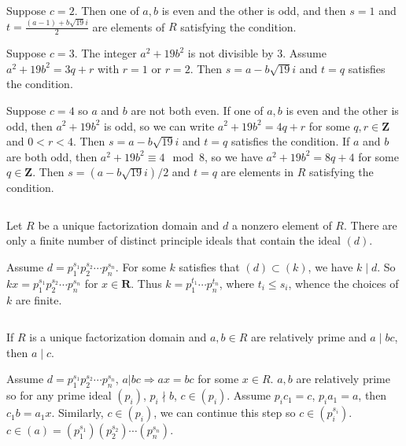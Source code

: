 \begin{answer}
    Suppose $c=2$. Then one of $a,b$ is even and the other is odd, and then $s=1$ and $t=\frac{(a-1)+b\sqrt{19}i}{2}$ are elements of $R$ satisfying the condition.
    
    Suppose $c=3$. The integer $a^{2}+19b^{2}$ is not divisible by 3. Assume $a^{2}+19b^{2}=3q+r$ with $r=1$ or $r=2$. Then $s=a-b\sqrt{19}i$ and $t=q$ satisfies the condition.

    Suppose $c=4$ so $a$ and $b$ are not both even. If one of $a,b$ is even and the other is odd, then $a^{2}+19b^{2}$ is odd, so we can write $a^{2}+19b^{2}=4q+r$ for some $q,r\in \mathbf{Z}$ and $0<r<4$. Then $s=a-b\sqrt{19}i$ and $t=q$ satisfies the condition. If $a$ and $b$ are both odd, then $a^{2}+19b^{2}\equiv 4\mod 8$, so we have $a^{2}+19b^{2}=8q+4$ for some $q\in\mathbf{Z}$. Then $s=(a-b\sqrt{19}i) /2$ and $t=q$ are elements in $R$ satisfying the condition.
\end{answer}

$$ $$

\begin{ex}
    Let $R$ be a unique factorization domain and $d$ a nonzero element of $R$. There are only a finite number of distinct principle ideals that contain the ideal $(d)$.
\end{ex}

\begin{answer}
    Assume $d=p_{1}^{s_{1}}p_{2}^{s_{2}}\cdots p_{n}^{s_{n}}$. For some $k$ satisfies that $(d)\subset (k)$, we have $k\mid d$. So $kx=p_{1}^{s_{1}}p_{2}^{s_{2}}\cdots p_{n}^{s_{n}}$ for $x\in\mathbf{R}$. Thus $k=p_{1}^{t_{1}}\cdots p_{n}^{t_{n}}$, where $t_{i}\leq s_{i}$, whence the choices of $k$ are finite.
\end{answer}

$$ $$

\begin{ex}
    If $R$ is a unique factorization domain and $a,b\in R$ are relatively prime and $a\mid bc$, then $a\mid c$.
\end{ex}

\begin{answer}
    Assume $d=p_{1}^{s_{1}}p_{2}^{s_{2}}\cdots p_{n}^{s_{n}}$, $a|bc\Rightarrow ax=bc$ for some $x\in R$. $a,b$ are relatively prime so for any prime ideal $(p_{i})$, $p_{i}\nmid b$, $c\in (p_{i})$. Assume $p_{i}c_{1}=c$, $p_{i}a_{1}=a$, then $c_{1}b=a_{1}x$. Similarly, $c\in (p_{i})$, we can continue this step so $c\in (p_{i}^{s_{i}})$. $c\in (a)=(p_{1}^{s_{1}})(p_{2}^{s_{2}})\cdots(p_{n}^{s_{n}})$.
\end{answer}

